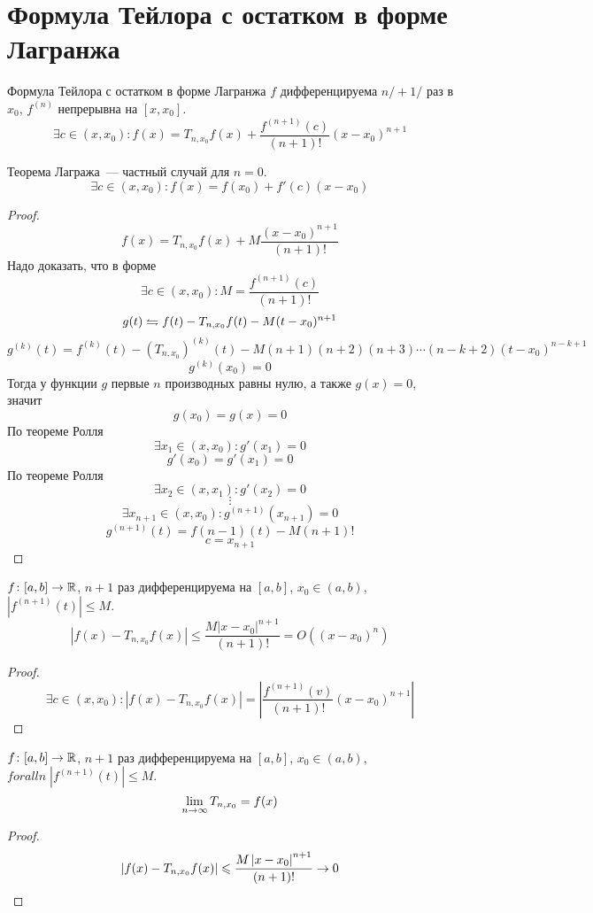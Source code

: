 ﻿\section{Формула Тейлора с остатком в форме Лагранжа}

\begin{theorem}{Формула Тейлора с остатком в форме Лагранжа}
$f$ дифференцируема $n/ + 1/$ раз в $x_0$, $f^{(n)}$ непрерывна на $[x, x_0]$.
$$\exists c \in (x, x_0)\colon f(x) = T_{n, x_0} f(x) + \frac{f^{(n+1)}(c)}{(n+1)!} (x-x_0)^{n+1}$$
\end{theorem}
\begin{Rem}
Теорема Лагража~--- частный случай для $n = 0$.
$$\exists c\in(x,x_0)\colon f(x) = f(x_0) + f'(c)(x-x_0)$$
\end{Rem}
\begin{proof}
$$f(x) = T_{n, x_0} f(x) + M \frac{(x-x_0)^{n+1}}{(n+1)!}$$
Надо доказать, что в форме
$$\exists c\in(x,x_0)\colon M = \frac{f^{(n+1)}(c)}{(n+1)!}$$
$$g(t) \leftrightharpoons f(t) - T_{n, x_0} f(t) - M(t-x_0)^{n+1}$$
$$g^{(k)} (t) = f^{(k)}(t) - (T_{n, x_0})^{(k)} (t) - M(n+1)(n+2)(n+3)\cdots(n-k+2)(t-x_0)^{n-k+1}$$
$$g^{(k)} (x_0) = 0$$
Тогда у функции $g$ первые $n$ производных равны нулю, а также $g(x) = 0$, значит
$$g(x_0) = g(x) = 0$$
По теореме Ролля
$$\exists x_1\in(x, x_0)\colon g'(x_1) = 0$$
$$g'(x_0) = g'(x_1) = 0$$
По теореме Ролля
$$\exists x_2\in(x, x_1)\colon g'(x_2) = 0$$
$$\vdots$$
$$\exists x_{n+1}\in(x, x_0)\colon g^{(n+1)}(x_{n+1}) = 0$$
$$g^{(n+1)}(t) = f{(n-1)}(t) - M(n+1)!$$
$$c = x_{n+1}$$
\end{proof}

\begin{conseq}
$f\colon [a, b] \rightarrow \mathbb{R}$, $n+1$ раз дифференцируема на $[a, b]$, $x_0 \in (a, b)$, $\left|f^{(n+1)} (t)\right| \leqslant M$.
$$\left|f(x) - T_{n, x_0} f(x)\right| \leqslant \frac{M \left|x-x_0\right|^{n+1}}{(n+1)!} = O\left((x-x_0)^n\right)$$
\end{conseq}
\begin{proof}
$$\exists c \in (x,x_0)\colon \left|f(x) - T_{n, x_0} f(x)\right| = \left|\frac{f^{(n+1)}(v)}{(n+1)!}(x-x_0)^{n+1}\right|$$
\end{proof}

\begin{conseq}
$f\colon [a, b] \rightarrow \mathbb{R}$, $n+1$ раз дифференцируема на $[a, b]$, $x_0 \in (a, b)$, $forall n\; \left|f^{(n+1)} (t)\right| \leqslant M$.
$$\lim_{n\rightarrow\infty} T_{n, x_0} = f(x)$$
\end{conseq}
\begin{proof}
$$\left|f(x) - T_{n, x_0} f(x)\right| \leqslant \frac{M \left|x-x_0\right|^{n+1}}{(n+1)!} \rightarrow 0$$
\end{proof}
